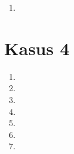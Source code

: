 \documentclass[11pt,a4paper]{article}
\newcommand{\codeListing}[3] {

      


      }
\begin{document}
\begin{multicols}{2}
\begin{enumerate}
          \item \codeListing{3}{4}{0.5}

        \end{enumerate}

        \columnbreak

        \section*{Kasus 4}
        \begin{enumerate}

          \item \codeListing{4}{1}{0.5}

          \item \codeListing{4}{2}{0.5}

          \item \codeListing{4}{3}{0.5}

          \item \codeListing{4}{4}{0.5}

          \item \codeListing{4}{5}{0.5}

          \item \codeListing{4}{6}{0.5}

          \item \codeListing{4}{7}{0.5}

        \end{enumerate}

      \end{multicols}

    
\end{document}
